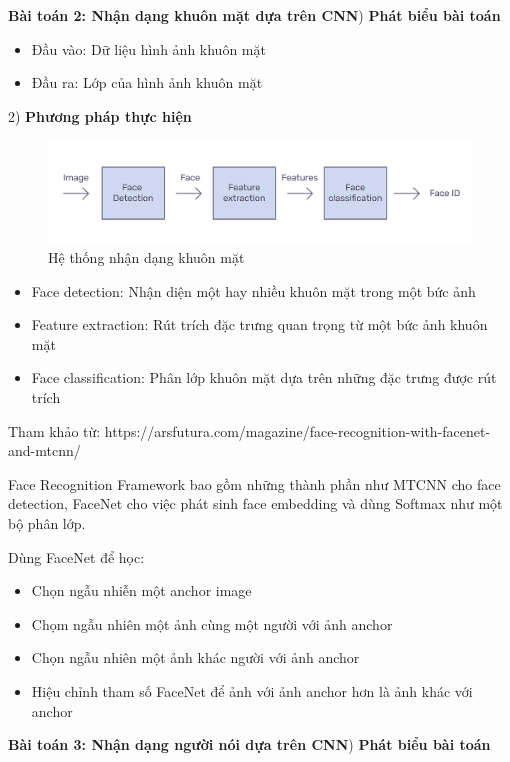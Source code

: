 \documentclass{article}
\begin{document}
	\textbf{Bài toán 2:  Nhận dạng khuôn mặt dựa trên CNN}) \textbf{Phát biểu bài toán}\newline
	\begin{itemize}
		\item Đầu vào: Dữ liệu hình ảnh khuôn mặt
		\item Đầu ra: Lớp của hình ảnh khuôn mặt
	\end{itemize}
	2) \textbf{Phương pháp thực hiện}\newline
	\begin{figure}[H]
		\centering
		\includegraphics[width=0.75\linewidth]{images/face-recognition-pipeline.png}
		\caption{Hệ thống nhận dạng khuôn mặt}
		\label{fig:writing-thesis}
	\end{figure}
	\begin{itemize}
		\item Face detection: Nhận diện một hay nhiều khuôn mặt trong một bức ảnh
		\item Feature extraction: Rút trích đặc trưng quan trọng từ một bức ảnh khuôn mặt
		\item Face classification: Phân lớp khuôn mặt dựa trên những đặc trưng được rút trích
	\end{itemize}
	Tham khảo từ: https://arsfutura.com/magazine/face-recognition-with-facenet-and-mtcnn/
	
	Face Recognition Framework bao gồm những thành phần như MTCNN cho face detection, FaceNet cho việc phát sinh face embedding và dùng Softmax như một bộ phân lớp.
	
	Dùng FaceNet để học:
	\begin{itemize}
		\item Chọn ngẫu nhiễn một anchor image
		\item Chọm ngẫu nhiên một ảnh cùng một người với ảnh anchor
		\item Chọn ngẫu nhiên một ảnh khác người với ảnh anchor
		\item Hiệu chỉnh tham số FaceNet để ảnh với ảnh anchor hơn là ảnh khác với anchor
	\end{itemize}
	
	\textbf{Bài toán 3: Nhận dạng người nói dựa trên CNN}) \textbf{Phát biểu bài toán}\newline
	
\end{document}
